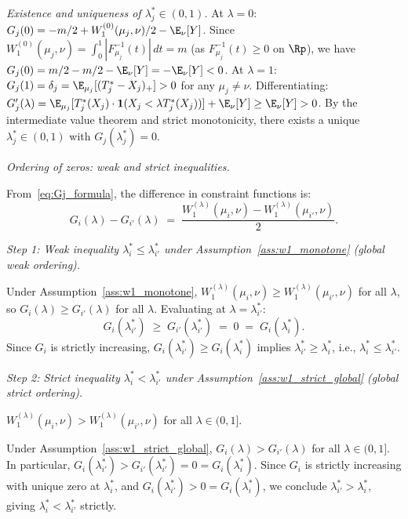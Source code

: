 \emph{Existence and uniqueness of $\lambda_j^* \in (0,1)$.}
At $\lambda=0$: $G_j(0) = -m/2 + W_1^{(0)}(\mu_j,\nu)/2 - \E_\nu[Y]$. Since $W_1^{(0)}(\mu_j,\nu) = \int_0^1|F_{\mu_j}^{-1}(t)|\,dt = m$ (as $F_{\mu_j}^{-1}(t) \geq 0$ on $\Rp$), we have $G_j(0) = m/2 - m/2 - \E_\nu[Y] = -\E_\nu[Y] < 0$.
At $\lambda=1$: $G_j(1) = \delta_j = \E_{\mu_j}[(T_j^*-X_j)_+] > 0$ for any $\mu_j \neq \nu$.
Differentiating: $G_j'(\lambda) = \E_{\mu_j}[T_j^*(X_j)\cdot\mathbf{1}(X_j < \lambda T_j^*(X_j))] + \E_\nu[Y] \geq \E_\nu[Y] > 0$.
By the intermediate value theorem and strict monotonicity, there exists a unique $\lambda_j^* \in (0,1)$ with $G_j(\lambda_j^*) = 0$.

\emph{Ordering of zeros: weak and strict inequalities.}

From~\eqref{eq:Gj_formula}, the difference in constraint functions is:
\[
  G_i(\lambda) - G_{i'}(\lambda) \;=\; \frac{W_1^{(\lambda)}(\mu_i,\nu) - W_1^{(\lambda)}(\mu_{i'},\nu)}{2}.
\]

\emph{Step 1: Weak inequality $\lambda_i^* \leq \lambda_{i'}^*$ under Assumption~\ref{ass:w1_monotone} (global weak ordering).}

Under Assumption~\ref{ass:w1_monotone}, $W_1^{(\lambda)}(\mu_i,\nu) \geq W_1^{(\lambda)}(\mu_{i'},\nu)$ for all $\lambda$, so $G_i(\lambda) \geq G_{i'}(\lambda)$ for all $\lambda$. Evaluating at $\lambda = \lambda_{i'}^*$:
\[
  G_i(\lambda_{i'}^*) \;\geq\; G_{i'}(\lambda_{i'}^*) \;=\; 0 \;=\; G_i(\lambda_i^*).
\]
Since $G_i$ is strictly increasing, $G_i(\lambda_{i'}^*) \geq G_i(\lambda_i^*)$ implies $\lambda_{i'}^* \geq \lambda_i^*$, i.e., $\lambda_i^* \leq \lambda_{i'}^*$.

\emph{Step 2: Strict inequality $\lambda_i^* < \lambda_{i'}^*$ under Assumption~\ref{ass:w1_strict_global} (global strict ordering).}

\begin{assumption}
\label{ass:w1_strict_global}
$W_1^{(\lambda)}(\mu_i,\nu) > W_1^{(\lambda)}(\mu_{i'},\nu)$ for all $\lambda \in (0,1]$.
\end{assumption}

Under Assumption~\ref{ass:w1_strict_global}, $G_i(\lambda) > G_{i'}(\lambda)$ for all $\lambda \in (0,1]$. In particular, $G_i(\lambda_{i'}^*) > G_{i'}(\lambda_{i'}^*) = 0 = G_i(\lambda_i^*)$. Since $G_i$ is strictly increasing with unique zero at $\lambda_i^*$, and $G_i(\lambda_{i'}^*) > 0 = G_i(\lambda_i^*)$, we conclude $\lambda_{i'}^* > \lambda_i^*$, giving $\lambda_i^* < \lambda_{i'}^*$ strictly.

